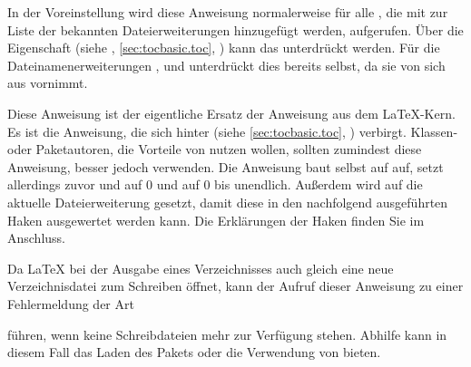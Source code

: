 In der Voreinstellung wird diese Anweisung normalerweise für alle
, die mit  zur
Liste der bekannten Dateierweiterungen hinzugefügt werden, aufgerufen. Über
die Eigenschaft  (siehe
, \autoref{sec:tocbasic.toc},
) kann das unterdrückt werden. Für die
Dateinamenerweiterungen ,  und  unterdrückt
 dies bereits selbst, %
\iftrue%
da  sie von sich aus vornimmt.%
\else%
damit die Umschaltung nicht mehrfach in die zugehörigen Dateien
eingetragen wird.%
\fi
\iffalse%
Normalerweise gibt es keinen Grund, diese Anweisung selbst aufzurufen. Es sind
allerdings Verzeichnisse denkbar, die nicht unter der Kontrolle von
\Package{tocbasic} stehen, also nicht in der Liste der bekannten
Dateierweiterungen geführt werden, aber trotzdem die Spracherweiterung für
\Package{babel} nutzen sollen. Für derartige Verzeichnisse wäre die Anweisung
explizit aufzurufen. Bitte\textnote{Achtung!} achten Sie jedoch darauf, dass
dies für jede Dateierweiterung nur einmal geschieht!%
\fi
\EndIndexGroup


\begin{Declaration}
\end{Declaration}
Diese Anweisung ist der eigentliche Ersatz der Anweisung
 aus dem
\LaTeX-Kern. Es ist die Anweisung, die sich hinter
 (siehe \autoref{sec:tocbasic.toc},
) verbirgt. Klassen- oder Paketautoren,
die Vorteile von  nutzen wollen, sollten zumindest diese
Anweisung, besser jedoch  verwenden. Die
Anweisung baut selbst auf  auf, setzt allerdings zuvor
 und
 auf 0 und
 auf 0 bis unendlich. Außerdem
wird  auf die
aktuelle Dateierweiterung gesetzt, damit diese in den nachfolgend ausgeführten
Haken ausgewertet werden kann. Die Erklärungen der Haken finden
Sie im Anschluss.

Da \LaTeX{} bei der Ausgabe eines Verzeichnisses auch
gleich eine neue Verzeichnisdatei zum Schreiben öffnet, kann der Aufruf dieser
Anweisung zu einer Fehlermeldung der Art
führen, wenn keine Schreibdateien mehr zur Verfügung stehen. Abhilfe kann in
diesem Fall das Laden des Pakets
\cite{package:scrwfile} oder die Verwendung von \LuaLaTeX{} bieten.%
\EndIndexGroup


